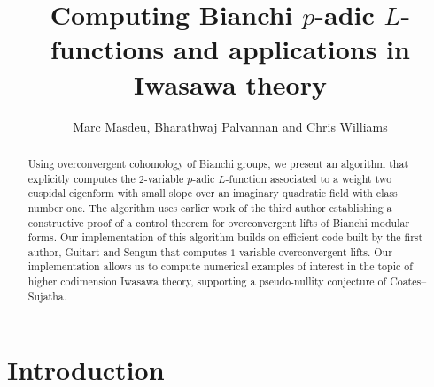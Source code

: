\documentclass[a4paper,11pt]{article}
\title{Computing Bianchi $p$-adic $L$-functions and applications in Iwasawa theory}
\author{Marc Masdeu, Bharathwaj Palvannan and Chris Williams}
\date{}
\newcommand{\CWnote}[1]{
 \begin{color}{red}
 \marginpar{$\spadesuit$} #1
  --- Chris
 \end{color}
}
\newcommand{\CWnote}[1]{

}
\numberwithin{equation}{section}
\begin{document}
%
%

\maketitle
\setcounter{tocdepth}{2}

\begin{abstract}
\begin{comment}
Let $\f$ be a cuspidal eigenform of weight 2 over an imaginary quadratic field $K$. In this paper, we use the overconvergent cohomology of Bianchi groups to explicitly compute $p$-adic $L$-functions attached to $\f$. We give several applications to Iwasawa theory: in particular, we provide new examples where Coates and Sujatha's psuedo-nullity conjecture holds for rational elliptic curves.  --- including the first examples in rank 1.
\end{comment}
Using overconvergent cohomology of Bianchi groups, we present an algorithm that explicitly computes the $2$-variable $p$-adic $L$-function associated to a weight two cuspidal eigenform with small slope over an imaginary quadratic field with class number one. The algorithm uses earlier work of the third author establishing a constructive proof of a control theorem for overconvergent lifts of Bianchi modular forms. Our implementation of this algorithm builds on efficient code built by the first author, Guitart and Sengun that computes $1$-variable overconvergent lifts. Our implementation allows us to compute numerical examples of interest in the topic of higher codimension Iwasawa theory, supporting a pseudo-nullity conjecture of Coates--Sujatha.

\begin{comment}
In these numerical examples, the validity of the appropriate Iwasawa main conjectures \CWnote{We're treating base-change cases, right? I think the IMC might even be known in this setting - I think it's a key part of the proof of the IMC for elliptic curves?} implies that the Pontraygin dual of the fine Selmer group is pseudo-null.
\end{comment}
\end{abstract}

\tableofcontents

\section{Introduction}
\end{document}
